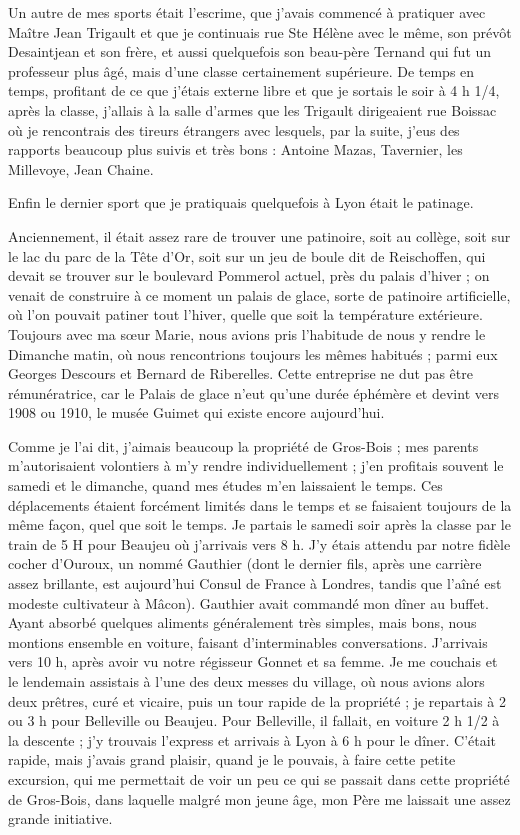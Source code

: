 \documentclass[11pt,a4paper]{report}
\begin{document}
Un autre de mes sports était l'escrime, que j'avais commencé à pratiquer avec Maître Jean Trigault et que je continuais rue Ste Hélène avec le même, son prévôt Desaintjean et son frère, et aussi quelquefois son beau-père Ternand qui fut un professeur plus âgé, mais d'une classe certainement supérieure. De temps en temps, profitant de ce que j'étais externe libre et que je sortais le soir à 4 h 1/4, après la classe, j'allais à la salle d'armes que les Trigault dirigeaient rue Boissac où je rencontrais des tireurs étrangers avec lesquels, par la suite, j'eus des rapports beaucoup plus suivis et très bons : Antoine Mazas, Tavernier, les Millevoye, Jean Chaine.

Enfin le dernier sport que je pratiquais quelquefois à Lyon était le patinage.

Anciennement, il était assez rare de trouver une patinoire, soit au collège, soit sur le lac du parc de la Tête d'Or, soit sur un jeu de boule dit de Reischoffen, qui devait se trouver sur le boulevard Pommerol actuel, près du palais d'hiver ; on venait de construire à ce moment un palais de glace, sorte de patinoire artificielle, où l'on pouvait patiner tout l'hiver, quelle que soit la température extérieure. Toujours avec ma sœur Marie, nous avions pris l'habitude de nous y rendre le Dimanche matin, où nous rencontrions toujours les mêmes habitués ; parmi eux Georges Descours et Bernard de Riberelles. Cette entreprise ne dut pas être rémunératrice, car le Palais de glace n'eut qu'une durée éphémère et devint vers 1908 ou 1910, le musée Guimet qui existe encore aujourd'hui.

Comme je l'ai dit, j'aimais beaucoup la propriété de Gros-Bois ; mes parents m'autorisaient volontiers à m'y rendre individuellement ; j'en profitais souvent le samedi et le dimanche, quand mes études m'en laissaient le temps. Ces déplacements étaient forcément limités dans le temps et se faisaient toujours de la même façon, quel que soit le temps. Je partais le samedi soir après la classe par le train de 5 H pour Beaujeu où j'arrivais vers 8 h. J'y étais attendu par notre fidèle cocher d'Ouroux, un nommé Gauthier (dont le dernier fils, après une carrière assez brillante, est aujourd'hui Consul de France à Londres, tandis que l'aîné est modeste cultivateur à Mâcon). Gauthier avait commandé mon dîner au buffet. Ayant absorbé quelques aliments généralement très simples, mais bons, nous montions ensemble en voiture, faisant d'interminables conversations. J'arrivais vers 10 h, après avoir vu notre régisseur Gonnet et sa femme. Je me couchais et le lendemain assistais à l'une des deux messes du village, où nous avions alors deux prêtres, curé et vicaire, puis un tour rapide de la propriété ; je repartais à 2 ou 3 h pour Belleville ou Beaujeu. Pour Belleville, il fallait, en voiture 2 h 1/2 à la descente ; j'y trouvais l'express et arrivais à Lyon à 6 h pour le dîner. C'était rapide, mais j'avais grand plaisir, quand je le pouvais, à faire cette petite excursion, qui me permettait de voir un peu ce qui se passait dans cette propriété de Gros-Bois, dans laquelle malgré mon jeune âge, mon Père me laissait une assez grande initiative.
\end{document}
